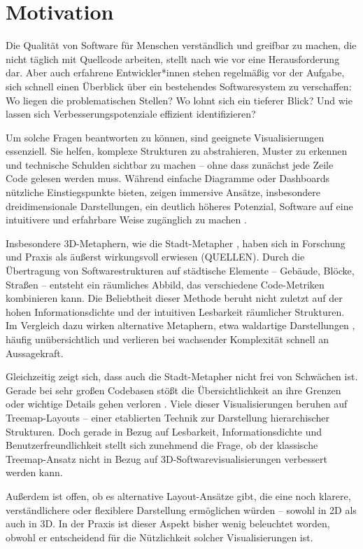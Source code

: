 \section{Motivation} \label{sec:Motivation}
Die Qualität von Software für Menschen verständlich und greifbar zu machen, die nicht täglich mit Quellcode arbeiten, stellt nach wie vor eine Herausforderung dar. Aber auch erfahrene Entwickler*innen stehen regelmäßig vor der Aufgabe, sich schnell einen Überblick über ein bestehendes Softwaresystem zu verschaffen: Wo liegen die problematischen Stellen? Wo lohnt sich ein tieferer Blick? Und wie lassen sich Verbesserungspotenziale effizient identifizieren?

Um solche Fragen beantworten zu können, sind geeignete Visualisierungen essenziell. Sie helfen, komplexe Strukturen zu abstrahieren, Muster zu erkennen und technische Schulden sichtbar zu machen – ohne dass zunächst jede Zeile Code gelesen werden muss. Während einfache Diagramme oder Dashboards nützliche Einstiegspunkte bieten, zeigen immersive Ansätze, insbesondere dreidimensionale Darstellungen, ein deutlich höheres Potenzial, Software auf eine intuitivere und erfahrbare Weise zugänglich zu machen \cite{3dsoftwareMarcus,codeCity1,first_3D_vis,virtualButVisibleMunro}.

Insbesondere 3D-Metaphern, wie die Stadt-Metapher \cite{codeCity1}, haben sich in Forschung und Praxis als äußerst wirkungsvoll erwiesen (QUELLEN). Durch die Übertragung von Softwarestrukturen auf städtische Elemente – Gebäude, Blöcke, Straßen – entsteht ein räumliches Abbild, das verschiedene Code-Metriken kombinieren kann. Die Beliebtheit dieser Methode beruht nicht zuletzt auf der hohen Informationsdichte und der intuitiven Lesbarkeit räumlicher Strukturen. Im Vergleich dazu wirken alternative Metaphern, etwa waldartige Darstellungen \cite{softwareForest}, häufig unübersichtlich und verlieren bei wachsender Komplexität schnell an Aussagekraft.

Gleichzeitig zeigt sich, dass auch die Stadt-Metapher nicht frei von Schwächen ist. Gerade bei sehr großen Codebasen stößt die Übersichtlichkeit an ihre Grenzen oder wichtige Details gehen verloren \cite{lu2008cascaded}. Viele dieser Visualisierungen beruhen auf Treemap-Layouts – einer etablierten Technik zur Darstellung hierarchischer Strukturen. Doch gerade in Bezug auf Lesbarkeit, Informationsdichte und Benutzerfreundlichkeit stellt sich zunehmend die Frage, ob der klassische Treemap-Ansatz nicht in Bezug auf 3D-Softwarevisualisierungen verbessert werden kann.

Außerdem ist offen, ob es alternative Layout-Ansätze gibt, die eine noch klarere, verständlichere oder flexiblere Darstellung ermöglichen würden – sowohl in 2D als auch in 3D. In der Praxis ist dieser Aspekt bisher wenig beleuchtet worden, obwohl er entscheidend für die Nützlichkeit solcher Visualisierungen ist.

